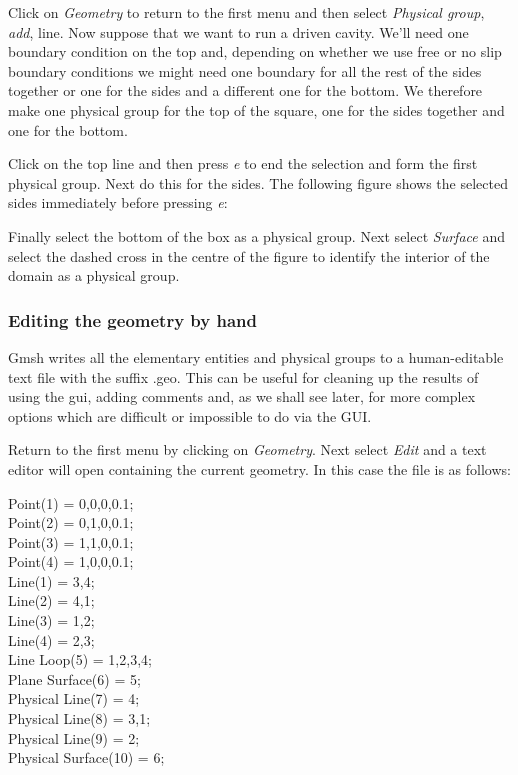 Click on \textit{Geometry} to return to the first menu and then select
\textit{Physical group}, \textit{add}, line. Now suppose that we want to run
a driven cavity. We'll need one boundary condition on the top and, depending
on whether we use free or no slip boundary conditions we might need one
boundary for all the rest of the sides together or one for the sides and a
different one for the bottom. We therefore make one physical group for the
top of the square, one for the sides together and one for the bottom.

Click on the top line and then press \textit{e} to end the selection and
form the first physical group. Next do this for the sides. The following
figure shows the selected sides immediately before pressing \textit{e}:

Finally select the bottom of the box as a physical group. Next select
\textit{Surface} and select the dashed cross in the centre of the figure to
identify the interior of the domain as a physical group.

\subsubsection{Editing the geometry by hand}

Gmsh writes all the elementary entities and physical groups to a human-editable text file with the suffix .geo. This can be useful for cleaning up the results of using the gui, adding comments and, as we shall see later, for more complex options which are difficult or impossible to do via the GUI.

Return to the first menu by clicking on \textit{Geometry}. Next select \textit{Edit} and a text editor will open containing the current geometry. In this case the file is as follows:

 Point(1) = {0,0,0,0.1}; \\
 Point(2) = {0,1,0,0.1}; \\ 
 Point(3) = {1,1,0,0.1}; \\
 Point(4) = {1,0,0,0.1}; \\
 Line(1) = {3,4}; \\
 Line(2) = {4,1}; \\
 Line(3) = {1,2}; \\
 Line(4) = {2,3}; \\
 Line Loop(5) = {1,2,3,4}; \\
 Plane Surface(6) = {5}; \\
 Physical Line(7) = {4}; \\
 Physical Line(8) = {3,1}; \\
 Physical Line(9) = {2}; \\
 Physical Surface(10) = {6}; \\

